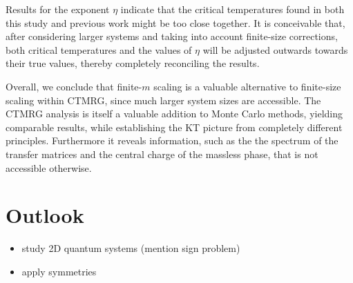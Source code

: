 Results for the exponent $\eta$ indicate that the critical temperatures found in both this study and previous work might
be too close together.
It is conceivable that, after considering larger systems and taking into account finite-size corrections,
both critical temperatures and the values of $\eta$ will be adjusted outwards towards their true values,
thereby completely reconciling the results.

Overall, we conclude that finite-$m$ scaling is a valuable alternative to finite-size scaling within CTMRG,
since much larger system sizes are accessible.
The CTMRG analysis is itself a valuable addition to Monte Carlo methods,
yielding comparable results, while establishing the KT picture from completely different principles.
Furthermore it reveals information, such as the the spectrum of the transfer matrices and the central charge of the
massless phase, that is not accessible otherwise.

\section{Outlook}

\begin{itemize}
  \item study 2D quantum systems (mention sign problem)
  \item apply symmetries
\end{itemize}
